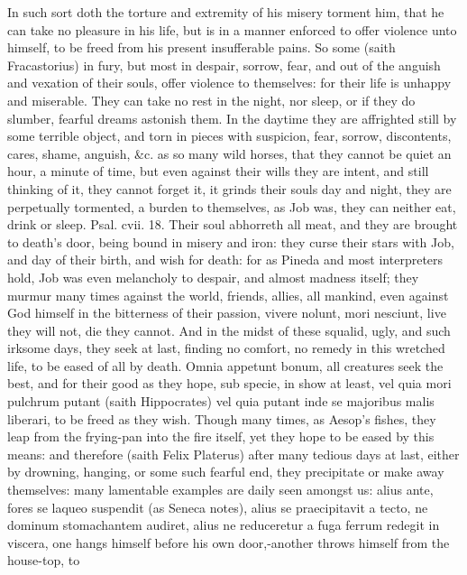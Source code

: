 In such sort doth the torture and extremity of his misery torment him,
that he can take no pleasure in his life, but is in a manner enforced
to offer violence unto himself, to be freed from his present
insufferable pains. So some (saith Fracastorius) in fury, but
most in despair, sorrow, fear, and out of the anguish and vexation of
their souls, offer violence to themselves: for their life is unhappy
and miserable. They can take no rest in the night, nor sleep, or if
they do slumber, fearful dreams astonish them. In the daytime they are
affrighted still by some terrible object, and torn in pieces with
suspicion, fear, sorrow, discontents, cares, shame, anguish, \&c. as so
many wild horses, that they cannot be quiet an hour, a minute of time,
but even against their wills they are intent, and still thinking of it,
they cannot forget it, it grinds their souls day and night, they are
perpetually tormented, a burden to themselves, as Job was, they can
neither eat, drink or sleep. Psal. cvii. 18. Their soul abhorreth all
meat, and they are brought to death's door, being bound in misery
and iron: they curse their stars with Job, and day of their
birth, and wish for death: for as Pineda and most interpreters hold,
Job was even melancholy to despair, and almost madness itself;
they murmur many times against the world, friends, allies, all mankind,
even against God himself in the bitterness of their passion,
vivere nolunt, mori nesciunt, live they will not, die they
cannot. And in the midst of these squalid, ugly, and such irksome days,
they seek at last, finding no comfort, no remedy in this wretched
life, to be eased of all by death. Omnia appetunt bonum, all creatures
seek the best, and for their good as they hope, sub specie, in show at
least, vel quia mori pulchrum putant (saith Hippocrates) vel quia
putant inde se majoribus malis liberari, to be freed as they wish.
Though many times, as Aesop's fishes, they leap from the frying-pan
into the fire itself, yet they hope to be eased by this means: and
therefore (saith Felix Platerus) after many tedious days at last,
either by drowning, hanging, or some such fearful end, they precipitate
or make away themselves: many lamentable examples are daily seen
amongst us: alius ante, fores se laqueo suspendit (as Seneca notes),
alius se praecipitavit a tecto, ne dominum stomachantem audiret, alius
ne reduceretur a fuga ferrum redegit in viscera, one hangs himself
before his own door,-another throws himself from the house-top, to
